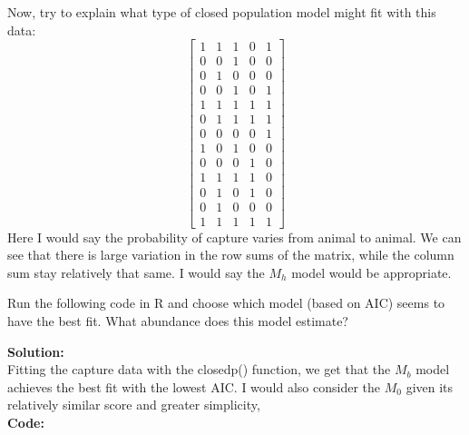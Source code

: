 \documentclass[12pt]{article}
\makeatletter
\theoremstyle{homework}
\newenvironment{exercise}[1]
{\def\@currentlabel{#1}\exercisecore}
{\endexercisecore}
\newcommand{\localhead}[1]{\par\smallskip\noindent\textbf{#1}\nobreak\\}%
\newcommand\solution{\localhead{Solution:}}
\makeatother
\begin{document}
\begin{exercise}{3}
\begin{enumerate}
    Now, try to explain what type of closed population model might fit with this data:
    \begin{equation*}
      \begin{bmatrix}
        1&1&1&0&1\\
        0&0&1&0&0\\
        0&1&0&0&0\\
        0&0&1&0&1\\
        1&1&1&1&1\\
        0&1&1&1&1\\
        0&0&0&0&1\\
        1&0&1&0&0\\
        0&0&0&1&0\\
        1&1&1&1&0\\
        0&1&0&1&0\\
        0&1&0&0&0\\
        1&1&1&1&1
      \end{bmatrix}
    \end{equation*}
    Here I would say the probability of capture varies from animal to animal. We can see that there is large variation in the row sums of the matrix, while the column sum stay relatively that same. I would say the 
    $M_h$ model would be appropriate. 
  \end{enumerate}
\end{exercise}
\vspace{1in}


\begin{exercise}{4} Run the following code in R and choose which model (based on AIC) seems to have the
  best fit.  What abundance does this model estimate?\\
  
  \solution Fitting the capture data with the closedp() function, we get that the $M_b$ model achieves the best fit with the lowest AIC. I would also 
  consider the $M_0$ given its relatively similar score and greater simplicity,  \\
  \textbf{Code:}  
  \begin{center}  
      
  \end{center}
\end{exercise}
\vspace{1in}
\end{document}
